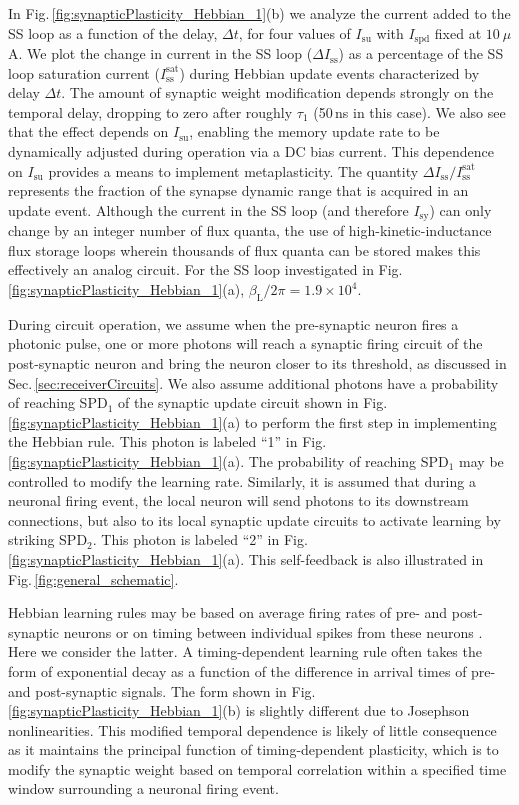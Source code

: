 \documentclass[aip,amsmath,amssymb,reprint,nofootinbib]{revtex4-1}
\begin{document}
In Fig.\,\ref{fig:synapticPlasticity_Hebbian_1}(b) we analyze the current added to the SS loop as a function of the delay, $\Delta t$, for four values of $I_{\mathrm{su}}$ with $I_{\mathrm{spd}}$ fixed at $10~\mu$A. We plot the change in current in the SS loop ($\Delta I_{\mathrm{ss}}$) as a percentage of the SS loop saturation current ($I_{\mathrm{ss}}^{\mathrm{sat}}$) during Hebbian update events characterized by delay $\Delta t$. The amount of synaptic weight modification depends strongly on the temporal delay, dropping to zero after roughly $\tau_1$ (50\,ns in this case). We also see that the effect depends on $I_{\mathrm{su}}$, enabling the memory update rate to be dynamically adjusted during operation via a DC bias current. This dependence on $I_{\mathrm{su}}$ provides a means to implement metaplasticity. The quantity $\Delta I_{\mathrm{ss}}/I_{\mathrm{ss}}^{\mathrm{sat}}$ represents the fraction of the synapse dynamic range that is acquired in an update event. Although the current in the SS loop (and therefore $I_{\mathrm{sy}}$) can only change by an integer number of flux quanta, the use of high-kinetic-inductance flux storage loops wherein thousands of flux quanta can be stored makes this effectively an analog circuit. For the SS loop investigated in Fig.\,\ref{fig:synapticPlasticity_Hebbian_1}(a), $\beta_{\mathrm{L}}/2\pi = 1.9\times 10^4$. 

During circuit operation, we assume when the pre-synaptic neuron fires a photonic pulse, one or more photons will reach a synaptic firing circuit of the post-synaptic neuron and bring the neuron closer to its threshold, as discussed in Sec.\,\ref{sec:receiverCircuits}. We also assume additional photons have a probability of reaching SPD$_1$ of the synaptic update circuit shown in Fig.\,\ref{fig:synapticPlasticity_Hebbian_1}(a) to perform the first step in implementing the Hebbian rule. This photon is labeled ``1'' in Fig.\,\ref{fig:synapticPlasticity_Hebbian_1}(a). The probability of reaching SPD$_1$ may be controlled to modify the learning rate. Similarly, it is assumed that during a neuronal firing event, the local neuron will send photons to its downstream connections, but also to its local synaptic update circuits to activate learning by striking SPD$_2$. This photon is labeled ``2'' in Fig.\,\ref{fig:synapticPlasticity_Hebbian_1}(a). This self-feedback is also illustrated in Fig.\,\ref{fig:general_schematic}.

Hebbian learning rules may be based on average firing rates of pre- and post-synaptic neurons or on timing between individual spikes from these neurons \cite{geki2002}. Here we consider the latter. A timing-dependent learning rule often takes the form of exponential decay as a function of the difference in arrival times of pre- and post-synaptic signals. The form shown in Fig.\,\ref{fig:synapticPlasticity_Hebbian_1}(b) is slightly different due to Josephson nonlinearities. This modified temporal dependence is likely of little consequence as it maintains the principal function of timing-dependent plasticity, which is to modify the synaptic weight based on temporal correlation within a specified time window surrounding a neuronal firing event. 
\end{document}
